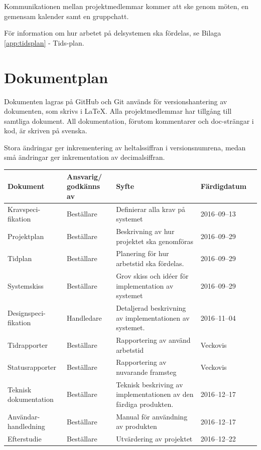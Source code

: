 \documentclass[a4paper,titlepage,12pt]{article}
\begin{document}
	Kommunikationen mellan projektmedlemmar kommer att ske genom möten, en
	gemensam kalender samt en gruppchatt.
	
	För information om hur arbetet på delsystemen ska fördelas, se Bilaga
	\ref{app:tidsplan} - Tids-plan.
	
	\section{Dokumentplan}
	Dokumenten lagras på GitHub och Git används för versionshantering av
	dokumenten, som skrivs i LaTeX. Alla projektmedlemmar har tillgång till
	samtliga dokument. All dokumentation, förutom kommentarer och doc-strängar
	i kod, är skriven på svenska.

	Stora ändringar ger inkrementering av heltalssiffran i versionsnumrena,
	medan små ändringar ger inkrementation av decimalsiffran.
	
	\begin{longtable}[l]{ p{2.5cm} p{2.1cm} >{\raggedright}p{4cm} p{2.2cm} l }
		\textbf{Dokument} & \textbf{Ansvarig/ godkänns av} & \textbf{Syfte} & \textbf{Färdigdatum} \\ \midrule
		
		Kravspeci-fikation & Beställare & Definierar alla krav på systemet & 2016--09--13 \\ \midrule

		Projektplan & Beställare & Beskrivning av hur projektet ska genomföras & 2016--09--29 \\ \midrule

		Tidplan & Beställare & Planering för hur arbetstid ska fördelas. & 2016--09--29  \\ \midrule
		
		Systemskiss & Beställare & Grov skiss och idéer för implementation av systemet & 2016--09--29 \\ \midrule

		Designspeci-fikation & Handledare & Detaljerad beskrivning av implementationen av systemet. & 2016--11--04 \\ \midrule

		Tidrapporter & Beställare & Rapportering av använd arbetstid & Veckovis		\\ \midrule

		Statusrapporter & Beställare & Rapportering av nuvarande framsteg & Veckovis \\ \midrule

		Teknisk dokumentation & Beställare & Teknisk beskriving av
		implementationen av den färdiga produkten. & 2016--12--17 \\ \midrule

		Användar- handledning & Beställare & Manual för användning av produkten & 2016--12--17 \\ \midrule

		Efterstudie & Beställare & Utvärdering av projektet & 2016--12--22  \\ \midrule
	\end{longtable}
	
\end{document}
